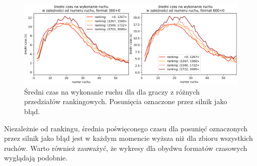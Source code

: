 \documentclass[inzynierska]{pwr_wmat_praca_dyplomowa}
\theoremstyle{plain}
\numberwithin{theorem}{chapter}
\theoremstyle{definition}
\numberwithin{theorem}{chapter}
\begin{document}
\begin{figure}[H]
	\centering
	\includegraphics[width=\textwidth]{sr_czas_na_ruch_ELO_2.png}
	\caption{Średni czas na wykonanie ruchu dla dla graczy z różnych przedziałów rankingowych. Posunięcia oznaczone przez silnik jako błąd.}
	\label{rys:sr_czas_na_ruch_ELO_2}
\end{figure}
Niezależnie od rankingu, średnia poświęconego czasu dla posunięć oznaczonych przez silnik jako błąd jest w każdym momencie wyższa niż dla zbioru wszystkich ruchów. 
Warto również zauważyć, że wykresy dla obydwu formatów czasowych wyglądają podobnie. 
\end{document}
